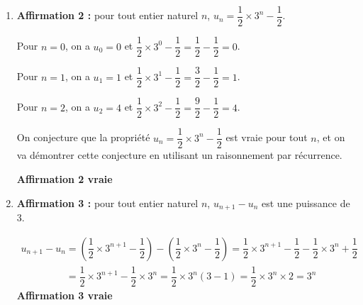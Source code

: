 \documentclass[10pt]{article}
\begin{document}
\begin{enumerate}
	\item \textbf{Affirmation 2 :} \og{} pour tout entier naturel $n$, $u_{n} = \dfrac{1}{2} \times 3^{n}-\dfrac{1}{2}$.\fg{}

Pour $n=0$, on a $u_0=0$ et $\dfrac{1}{2} \times 3^{0}-\dfrac{1}{2} = \dfrac{1}{2}-\dfrac{1}{2}=0$.

Pour $n=1$, on a $u_1=1$ et $\dfrac{1}{2} \times 3^{1}-\dfrac{1}{2} = \dfrac{3}{2}-\dfrac{1}{2}=1$.

Pour $n=2$, on a $u_2=4$ et $\dfrac{1}{2} \times 3^{2}-\dfrac{1}{2} = \dfrac{9}{2}-\dfrac{1}{2}=4$.

On conjecture que la propriété \og{} $u_{n} = \dfrac{1}{2} \times 3^{n}-\dfrac{1}{2}$\fg{} est vraie pour tout $n$, et on va démontrer cette conjecture en utilisant un raisonnement par récurrence.


\hfill \textbf{Affirmation 2 vraie}

\item \textbf{Affirmation 3 :} \og{} pour tout entier naturel $n$, \quad $u_{n + 1}-u_{n}$ est une puissance de 3.\fg{}

$\begin{gathered}u_{n+1}-u_n = \left (\dfrac{1}{2}\times 3^{n+1} -\dfrac{1}{2}\right ) - \left ( \dfrac{1}{2}\times 3^{n} -\dfrac{1}{2}\right )
= \dfrac{1}{2}\times 3^{n+1} -\dfrac{1}{2} - \dfrac{1}{2}\times 3^{n} +\dfrac{1}{2}\\
\phantom{u_{n+1}-u_n}
= \dfrac{1}{2}\times 3^{n+1} - \dfrac{1}{2}\times 3^{n}
= \dfrac{1}{2}\times 3^n\left (3-1\right )
= \dfrac{1}{2}\times 3^n \times 2
= 3^n\end{gathered}$
\hfill \textbf{Affirmation 3 vraie}
\end{enumerate}
\end{document}
